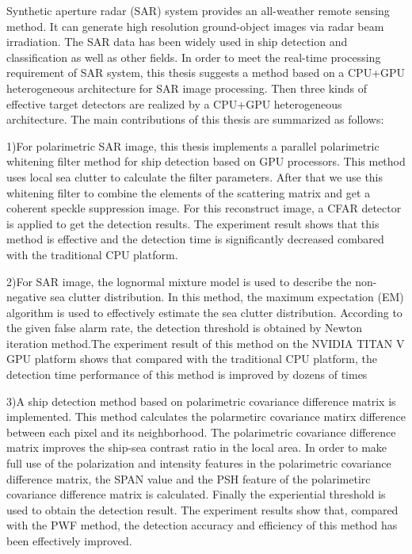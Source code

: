 \begin{eabstract}
  Synthetic aperture radar (SAR) system provides an all-weather remote sensing method. 
  It can generate high resolution ground-object images via radar beam irradiation. 
  The SAR data has been widely used in ship detection and classification as well as other fields. In order 
  to meet the real-time processing requirement of SAR system, this thesis
  suggests a method based on a CPU+GPU heterogeneous architecture for SAR image processing.
  Then three kinds of effective target detectors are realized by a CPU+GPU heterogeneous
  architecture. The main contributions of this thesis are summarized as follows:

  1)For polarimetric SAR image, this thesis implements a parallel polarimetric whitening filter method for 
  ship detection based on GPU processors. This method uses local sea clutter to calculate the filter parameters.
  After that we use this whitening filter to combine the elements of the scattering matrix and get a coherent 
  speckle suppression image. For this reconstruct image, a CFAR detector is applied to get the 
  detection results. The experiment result shows that this method is effective and the detection 
  time is significantly decreased combared with the traditional CPU platform.

  2)For SAR image, the lognormal mixture model is used to describe the non-negative 
  sea clutter distribution. In this method, the maximum expectation (EM) 
  algorithm is used to effectively estimate the sea clutter distribution. 
  According to the given false alarm rate, the detection threshold is 
  obtained by Newton iteration method.The experiment result of this method on the NVIDIA
  TITAN V GPU platform shows that compared with the traditional CPU platform, the detection
  time performance of this method is improved by dozens of times

 3)A ship detection method based on polarimetric covariance difference matrix is implemented.  This method calculates the polarmetirc covariance  
  matirx difference between each pixel and its neighborhood. The polarimetric covariance difference matrix improves
  the ship-sea contrast ratio in the local area.  In order to make full use of the polarization and intensity features 
  in the polarimetric covariance difference matrix, the SPAN value and the PSH feature of the polarimetirc covariance
  difference matrix is ​​calculated. Finally the experiential threshold is used to obtain the detection result.  
  The experiment results show that, compared with the PWF method, the detection accuracy and efficiency of this method has been effectively improved.

 
\end{eabstract}


